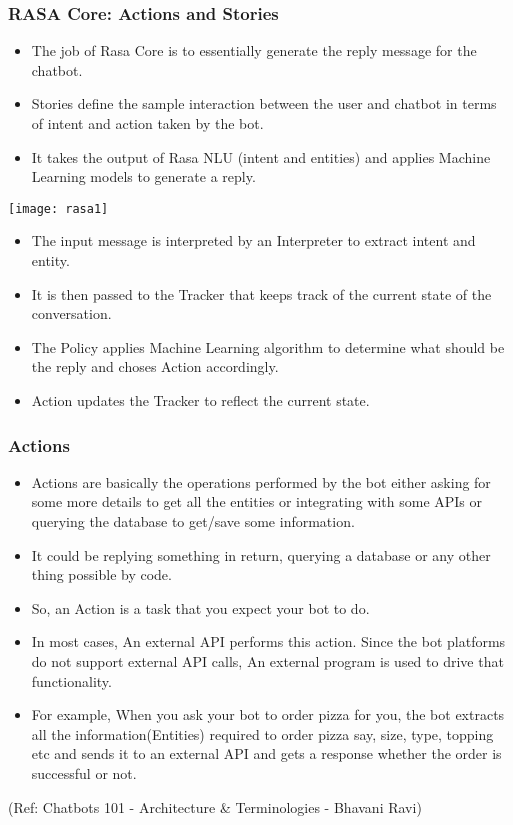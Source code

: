  \begin{frame}[fragile]\frametitle{RASA Core: Actions and Stories}
\begin{itemize}
\item The job of Rasa Core is to essentially generate the reply message for the chatbot. 
\item Stories define the sample interaction between the user and chatbot in terms of intent and action taken by the bot.
\item It takes the output of Rasa NLU (intent and entities) and applies Machine Learning models to generate a reply.
\end{itemize}

\begin{center}
\texttt{[image: rasa1]}
\end{center}

\begin{itemize}
\item The input message is interpreted by an Interpreter to extract intent and entity. 
\item It is then passed to the Tracker that keeps track of the current state of the conversation. 
\item The Policy applies Machine Learning algorithm to determine what should be the reply and choses Action accordingly.
\item Action updates the Tracker to reflect the current state.
\end{itemize}

\end{frame}


 \begin{frame}[fragile]\frametitle{Actions}
\begin{itemize}
\item Actions are basically the operations performed by the bot either asking for some more details to get all the entities or integrating with some APIs or querying the database to get/save some information.
\item It could be replying something in return, querying a database or any other thing possible by code.
\item So, an Action is a task that you expect your bot to do. 
\item In most cases, An external API performs this action. Since the bot platforms do not support external API calls, An external program is used to drive that functionality.
\item For example, When you ask your bot to order pizza for you, the bot extracts all the information(Entities) required to order pizza say, size, type, topping etc and sends it to an external API and gets a response whether the order is successful or not.

\end{itemize}

{\tiny (Ref: Chatbots 101 - Architecture \& Terminologies -  Bhavani Ravi)}

\end{frame}


